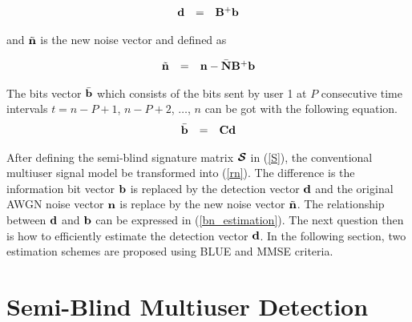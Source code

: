 \documentclass[a4paper,10pt,fleqn, twocolumn]{IEEETran}
\newcommand{\bb}{{\bf b}}
\newcommand{\bC}{{\bf C}}
\newcommand{\bd}{{\bf d}}
\newcommand{\bn}{{\bf n}}
\newcommand{\bN}{{\bf N}}
\newcommand{\bB}{{\bf B}}
\newcommand{\bcS}{{\mbox {\boldmath ${\cal S}$}}}
\begin{document}
\begin{equation}
\begin{array}{rcl}
\bd&=&\bB^+\bb
\end{array} \label{DetectorVector}
\end{equation}

\noindent and $\tilde{\bn}$ is the new noise vector and defined as

\begin{equation}
\begin{array}{rcl}
\tilde{\bn}&=&\bn-\bar{\bN}\bB^{+}\bb
\end{array} \label{new_noise}
\end{equation}


The bits vector $\bar{\bb}$ which consists of the bits sent by
user 1 at $P$ consecutive time intervals $t=n-P+1$, $n-P+2$,
$\ldots$, $n$ can be got with the following equation.
\begin{equation}
\begin{array}{rcl}
\bar{\bb}&=& \bC\bd
\end{array} \label{bn_estimation}
\end{equation}

After defining the semi-blind signature matrix $\bcS$ in
(\ref{S}), the conventional multiuser signal model be transformed
into (\ref{rn}). The difference is the information bit vector
$\bb$ is replaced by the detection vector $\bd$ and the original
AWGN noise vector $\bn$ is replace by the new noise vector
$\tilde{\bn}$. The relationship between $\bd$ and $\bb$ can be
expressed in (\ref{bn_estimation}). The next question then is how
to efficiently estimate the detection vector $\bd$. In the
following section, two estimation schemes are proposed using BLUE
and MMSE criteria.


\section{Semi-Blind Multiuser Detection}
\end{document}
